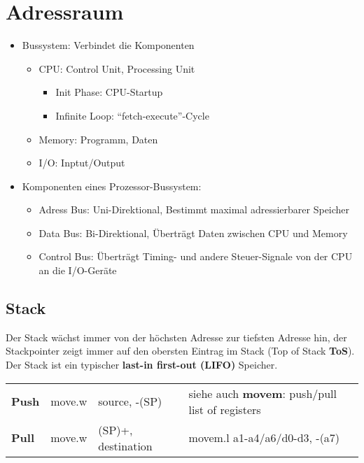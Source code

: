 \section{Adressraum}
\begin{multicols}{2}
\begin{itemize}
  \item Bussystem: Verbindet die Komponenten
  	\begin{itemize}
  		\item CPU: Control Unit, Processing Unit
  			\begin{itemize}
  				\item Init Phase: CPU-Startup
  				\item Infinite Loop: "`fetch-execute"'-Cycle
			\end{itemize}
  		\item Memory: Programm, Daten
  		\item I/O: Inptut/Output
	\end{itemize}
  \item Komponenten eines Prozessor-Bussystem:
  	\begin{itemize}
  		\item Adress Bus: Uni-Direktional, Bestimmt maximal adressierbarer Speicher
  		\item Data Bus: Bi-Direktional, Überträgt Daten zwischen CPU und Memory
  		\item Control Bus: Überträgt Timing- und andere Steuer-Signale von der CPU an die I/O-Geräte
	\end{itemize}
\end{itemize}
\end{multicols}

\subsection{Stack}
Der Stack wächst immer von der höchsten Adresse zur tiefsten Adresse hin, der Stackpointer zeigt immer auf den obersten Eintrag im Stack (Top of Stack \textbf{ToS}).
Der Stack ist ein typischer \textbf{last-in first-out (LIFO)} Speicher. \\
\begin{tabular}{lll|l}
	\textbf{Push}	& move.w	& source, -(SP)			& siehe auch \textbf{movem}: push/pull list of registers \\
	\textbf{Pull}	& move.w	& (SP)+, destination	& movem.l \quad a1-a4/a6/d0-d3, -(a7)
\end{tabular}

